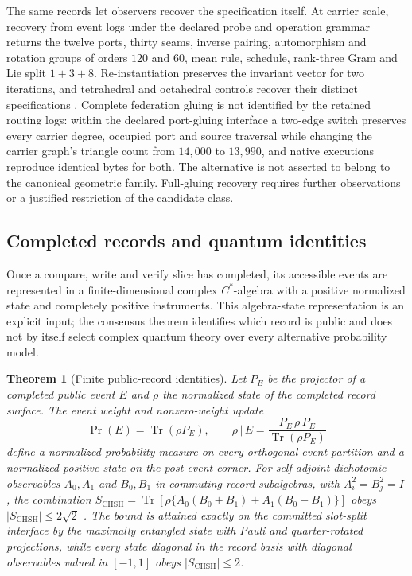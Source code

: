 \documentclass[11pt]{article}
\newtheorem{theorem}{Theorem}[section]
\theoremstyle{definition}
\theoremstyle{remark}
\begin{document}
The same records let observers recover the specification itself.
At carrier scale, recovery from event logs under the declared probe and
operation grammar returns the twelve ports, thirty seams, inverse pairing,
automorphism and rotation groups of orders $120$ and $60$, mean rule,
schedule, rank-three Gram and Lie split $1+3+8$.
Re-instantiation preserves the invariant vector for two iterations, and
tetrahedral and octahedral controls recover their distinct specifications
\cite{ophsim}. Complete federation gluing is not identified by the retained routing logs: within the declared port-gluing interface a two-edge switch preserves every carrier degree, occupied port and source traversal while changing the carrier graph's triangle count from $14{,}000$ to $13{,}990$, and native executions reproduce identical bytes for both.
The alternative is not asserted to belong to the canonical geometric family.
Full-gluing recovery requires further observations or a justified
restriction of the candidate class.

\subsection{Completed records and quantum identities}
\label{sec:quantum}

Once a compare, write and verify slice has completed, its accessible events
are represented in a finite-dimensional complex $C^*$-algebra with a
positive normalized state and completely positive instruments. This
algebra-state representation is an explicit input; the consensus theorem
identifies which record is public and does not by itself select complex
quantum theory over every alternative probability model.

\begin{theorem}[Finite public-record identities]
\label{thm:born}
Let $P_E$ be the projector of a completed public event $E$ and $\rho$ the
normalized state of the completed record surface. The event weight and
nonzero-weight update
\begin{equation}
\Pr(E)=\operatorname{Tr}(\rho P_E),
\qquad
\rho\,|\,E=\frac{P_E\,\rho\,P_E}{\operatorname{Tr}(\rho P_E)}
\end{equation}
define a normalized probability measure on every orthogonal event partition
and a normalized positive state on the post-event corner. For self-adjoint
dichotomic observables $A_0,A_1$ and $B_0,B_1$ in commuting record
subalgebras, with $A_i^2=B_j^2=I$, the combination
$S_{\mathrm{CHSH}}=\operatorname{Tr}[\rho\{A_0(B_0+B_1)+A_1(B_0-B_1)\}]$
obeys $|S_{\mathrm{CHSH}}|\le 2\sqrt 2$ \cite{chsh1969,tsirelson1980}. The bound is attained exactly on the
committed slot-split interface by the maximally entangled state with Pauli
and quarter-rotated projections, while every state diagonal in the record
basis with diagonal observables valued in $[-1,1]$ obeys
$|S_{\mathrm{CHSH}}|\le2$.
\end{theorem}
\end{document}
